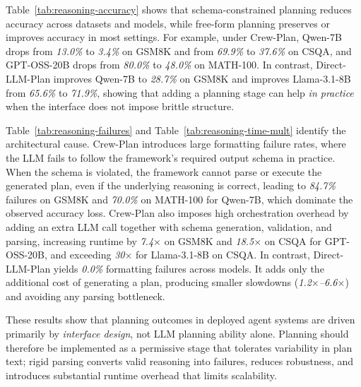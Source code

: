 Table~\ref{tab:reasoning-accuracy} shows that schema-constrained planning reduces accuracy across datasets and models, while free-form planning preserves or improves accuracy in most settings. For example, under Crew-Plan, Qwen-7B drops from \emph{13.0\%} to \emph{3.4\%} on GSM8K and from \emph{69.9\%} to \emph{37.6\%} on CSQA, and GPT-OSS-20B drops from \emph{80.0\%} to \emph{48.0\%} on MATH-100. In contrast, Direct-LLM-Plan improves Qwen-7B to \emph{28.7\%} on GSM8K and improves Llama-3.1-8B from \emph{65.6\%} to \emph{71.9\%}, showing that adding a planning stage can help \emph{in practice} when the interface does not impose brittle structure.


Table~\ref{tab:reasoning-failures} and Table~\ref{tab:reasoning-time-mult} identify the architectural cause. Crew-Plan introduces large formatting failure rates, where the LLM fails to follow the framework’s required output schema in practice. When the schema is violated, the framework cannot parse or execute the generated plan, even if the underlying reasoning is correct, leading to \emph{84.7\%} failures on GSM8K and \emph{70.0\%} on MATH-100 for Qwen-7B, which dominate the observed accuracy loss. Crew-Plan also imposes high orchestration overhead by adding an extra LLM call together with schema generation, validation, and parsing, increasing runtime by \emph{7.4$\times$} on GSM8K and \emph{18.5$\times$} on CSQA for GPT-OSS-20B, and exceeding \emph{30$\times$} for Llama-3.1-8B on CSQA. In contrast, Direct-LLM-Plan yields \emph{0.0\%} formatting failures across models. It adds only the additional cost of generating a plan, producing smaller slowdowns (\emph{1.2$\times$--6.6$\times$}) and avoiding any parsing bottleneck.


These results show that planning outcomes in deployed agent systems are driven primarily by \emph{interface design}, not LLM planning ability alone. Planning should therefore be implemented as a permissive stage that tolerates variability in plan text; rigid parsing converts valid reasoning into failures, reduces robustness, and introduces substantial runtime overhead that limits scalability.

